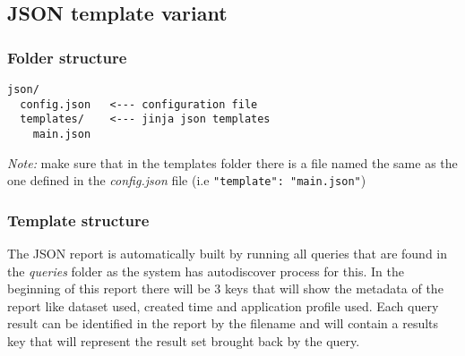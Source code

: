 \subsection{JSON template variant}
\subsubsection{Folder structure}

\begin{lstlisting}
json/
  config.json   <--- configuration file
  templates/    <--- jinja json templates
    main.json
\end{lstlisting}

\textit{Note:} make sure that in the templates folder there is a file named the same as the one defined in the \textit{config.json} file (i.e \texttt{"template": "main.json"})

\subsubsection{Template structure}
The JSON report is automatically built by running all queries that are found in the \textit{queries} folder as the system has autodiscover process for this. In the beginning of this report there will be 3 keys that will show the metadata of the report like dataset used, created time and application profile used. Each query result can be identified in the report by the filename and will contain a results key that will represent the result set brought back by the query.
